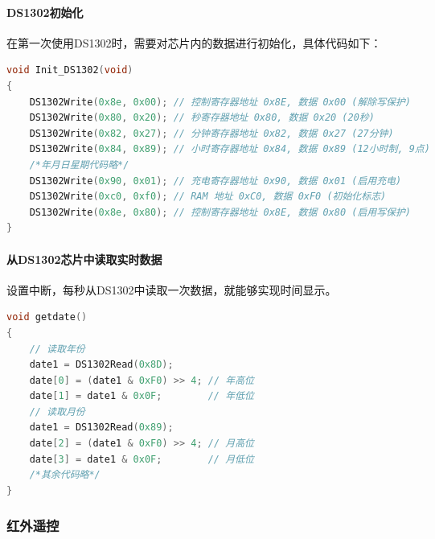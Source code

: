 \documentclass{article}
\begin{document}
\paragraph{DS1302初始化}在第一次使用DS1302时，需要对芯片内的数据进行初始化，具体代码如下：
\begin{multicols}{2}
\begin{lstlisting}[language=c]
void Init_DS1302(void)
{
    DS1302Write(0x8e, 0x00); // 控制寄存器地址 0x8E, 数据 0x00 (解除写保护)
    DS1302Write(0x80, 0x20); // 秒寄存器地址 0x80, 数据 0x20 (20秒)
    DS1302Write(0x82, 0x27); // 分钟寄存器地址 0x82, 数据 0x27 (27分钟)
    DS1302Write(0x84, 0x89); // 小时寄存器地址 0x84, 数据 0x89 (12小时制, 9点)
    /*年月日星期代码略*/
    DS1302Write(0x90, 0x01); // 充电寄存器地址 0x90, 数据 0x01 (启用充电)
    DS1302Write(0xc0, 0xf0); // RAM 地址 0xC0, 数据 0xF0 (初始化标志)
    DS1302Write(0x8e, 0x80); // 控制寄存器地址 0x8E, 数据 0x80 (启用写保护)
}
\end{lstlisting}
\end{multicols}
\paragraph{从DS1302芯片中读取实时数据}设置中断，每秒从DS1302中读取一次数据，就能够实现时间显示。
\begin{multicols}{2}
\begin{lstlisting}[language=c]
void getdate()
{
    // 读取年份
    date1 = DS1302Read(0x8D);
    date[0] = (date1 & 0xF0) >> 4; // 年高位
    date[1] = date1 & 0x0F;        // 年低位
    // 读取月份
    date1 = DS1302Read(0x89);
    date[2] = (date1 & 0xF0) >> 4; // 月高位
    date[3] = date1 & 0x0F;        // 月低位
    /*其余代码略*/
}
\end{lstlisting}
\end{multicols}
\subsubsection{红外遥控}
\end{document}
